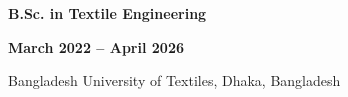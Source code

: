 \noindent
\begin{minipage}[t]{0.50\textwidth}
    \raggedright
    {\fontsize{12pt}{15pt}\bfseries B.Sc. in Textile Engineering}
\end{minipage}%
\hfill
\begin{minipage}[t]{0.50\textwidth}
    \raggedleft
    {\fontsize{12pt}{15pt}\bfseries March 2022 -- April 2026}
\end{minipage}
Bangladesh University of Textiles, Dhaka, Bangladesh\\
\vspace{0.3em}
\fi
